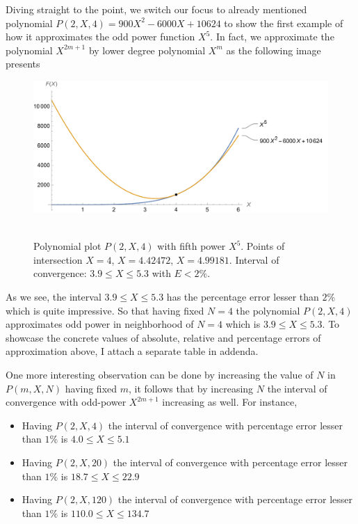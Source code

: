 Diving straight to the point, we switch our focus to already mentioned polynomial $P(2,X,4) = 900X^2 - 6000X + 10624$
to show the first example of how it approximates the odd power function $X^5$.
In fact, we approximate the polynomial $X^{2m+1}$ by lower degree polynomial $X^m$ as the following image presents
\begin{figure}[H]
    \centering
    \includegraphics[width=1\textwidth]{sections/images/03_plots_polynomial_p2_n4_with_fifth}
    ~\caption{Polynomial plot $P(2, X, 4)$ with fifth power $X^5$.
    Points of intersection $X=4$, $X=4.42472$, $X=4.99181$.
    Interval of convergence: $3.9 \leq X \leq 5.3$ with $E < 2\%$.
    }\label{fig:03_plots_polynomial_p2_n4_with_fifth}
\end{figure}
As we see, the interval $3.9 \leq X \leq 5.3$ has the percentage error lesser than $2\%$ which is quite impressive.
So that having fixed $N=4$ the polynomial $P(2, X, 4)$ approximates odd power in neighborhood of $N=4$
which is $3.9 \leq X \leq 5.3$.
To showcase the concrete values of absolute, relative and percentage errors of approximation above, I attach a separate
table in addenda.

One more interesting observation can be done by increasing the value of $N$ in $P(m, X, N)$ having fixed $m$, it
follows that by increasing $N$ the interval of convergence with odd-power $X^{2m+1}$ increasing as well.
For instance,
\begin{itemize}
    \item Having $P(2, X, 4)$ the interval of convergence with percentage error lesser than $1\%$ is $4.0 \leq X \leq 5.1$
    \item Having $P(2, X, 20)$ the interval of convergence with percentage error lesser than $1\%$ is $18.7 \leq X \leq 22.9$
    \item Having $P(2, X, 120)$ the interval of convergence with percentage error lesser than $1\%$ is $110.0 \leq X \leq 134.7$
\end{itemize}
